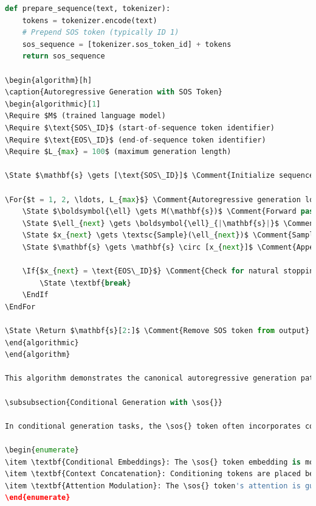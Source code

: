 \begin{lstlisting}[language=Python, caption=Standard \sos{} token implementation]
def prepare_sequence(text, tokenizer):
    tokens = tokenizer.encode(text)
    # Prepend SOS token (typically ID 1)
    sos_sequence = [tokenizer.sos_token_id] + tokens
    return sos_sequence

\begin{algorithm}[h]
\caption{Autoregressive Generation with SOS Token}
\begin{algorithmic}[1]
\Require $M$ (trained language model)
\Require $\text{SOS\_ID}$ (start-of-sequence token identifier)
\Require $\text{EOS\_ID}$ (end-of-sequence token identifier)
\Require $L_{max} = 100$ (maximum generation length)

\State $\mathbf{s} \gets [\text{SOS\_ID}]$ \Comment{Initialize sequence with SOS token}

\For{$t = 1, 2, \ldots, L_{max}$} \Comment{Autoregressive generation loop}
    \State $\boldsymbol{\ell} \gets M(\mathbf{s})$ \Comment{Forward pass through model}
    \State $\ell_{next} \gets \boldsymbol{\ell}_{|\mathbf{s}|}$ \Comment{Get logits for next token position}
    \State $x_{next} \gets \textsc{Sample}(\ell_{next})$ \Comment{Sample next token from distribution}
    \State $\mathbf{s} \gets \mathbf{s} \circ [x_{next}]$ \Comment{Append to sequence}
    
    \If{$x_{next} = \text{EOS\_ID}$} \Comment{Check for natural stopping}
        \State \textbf{break}
    \EndIf
\EndFor

\State \Return $\mathbf{s}[2:]$ \Comment{Remove SOS token from output}
\end{algorithmic}
\end{algorithm}

This algorithm demonstrates the canonical autoregressive generation pattern: start with SOS, iteratively predict and append tokens, and terminate upon EOS or maximum length.

\subsubsection{Conditional Generation with \sos{}}

In conditional generation tasks, the \sos{} token often incorporates conditioning information. This can be achieved through various mechanisms:

\begin{enumerate}
\item \textbf{Conditional Embeddings}: The \sos{} token embedding is modified based on conditioning information
\item \textbf{Context Concatenation}: Conditioning tokens are placed before the \sos{} token
\item \textbf{Attention Modulation}: The \sos{} token's attention is guided by conditioning signals
\end{enumerate}


\end{lstlisting}
